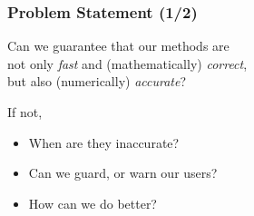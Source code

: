 \begin{frame}

\frametitle{Problem Statement (1/2)}

\vspace{\fill}

\begin{center}

Can we guarantee that our methods are \\ not only \emph{fast} and
(mathematically) \emph{correct}, \\ but also (numerically) \emph{accurate}?

\end{center}

\vspace{\fill}

If not,

\begin{itemize}

\item When are they inaccurate?

\item Can we guard, or warn our users?

\item How can we do better?

\end{itemize}

\vspace{\fill}

\end{frame}
